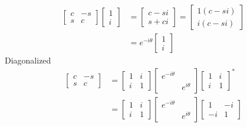 \documentclass{scrartcl}
\begin{document}
\begin{multicols*}{2}
\begin{align*}
    \begin{bmatrix}
      c & -s \\
      s & c
    \end{bmatrix}
    \begin{bmatrix}
      1 \\ i
    \end{bmatrix}
    &=
      \begin{bmatrix}
        c -si \\
        s + ci
      \end{bmatrix}
      =
      \begin{bmatrix}
        1(c -si) \\
        i(c-si)
      \end{bmatrix} \\
    & =e^{-i\theta}
      \begin{bmatrix}
        1 \\ i
      \end{bmatrix}
  \end{align*}
  Diagonalized
  \begin{align*}
    \begin{bmatrix}
      c & -s \\ s & c
    \end{bmatrix}
    &=
    \begin{bmatrix}
      1 & i \\
      i & 1
    \end{bmatrix}
    \begin{bmatrix}
      e^{-i\theta} \\ & e^{i\theta}
    \end{bmatrix}
    \begin{bmatrix}
      1 & i \\
      i & 1
    \end{bmatrix}^* \\
    &=
    \begin{bmatrix}
      1 & i \\
      i & 1
    \end{bmatrix}
    \begin{bmatrix}
      e^{-i\theta} \\ & e^{i\theta}
    \end{bmatrix}
    \begin{bmatrix}
      1 & -i \\
      -i & 1
    \end{bmatrix}
  \end{align*}


\end{multicols*}
\end{document}
